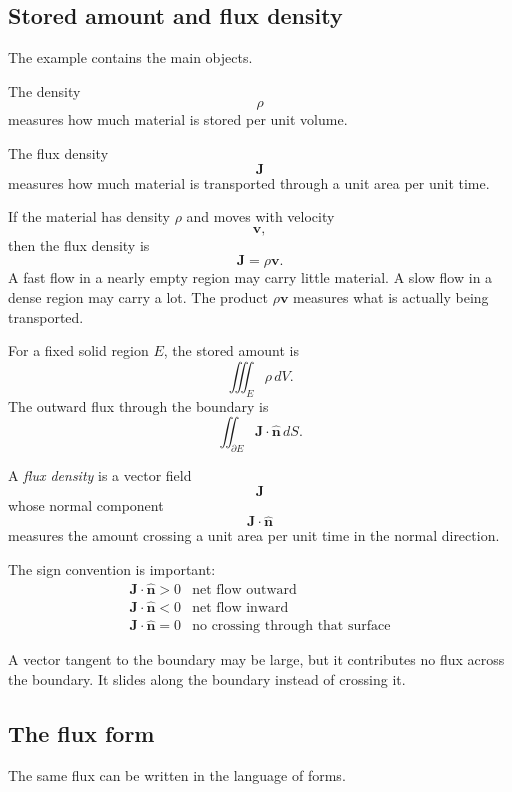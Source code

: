 \subsection{Stored amount and flux density}

The example contains the main objects.

The density
\[
    \rho
\]
measures how much material is stored per unit volume.

The flux density
\[
    \mathbf J
\]
measures how much material is transported through a unit area per unit time.

If the material has density \(\rho\) and moves with velocity
\[
    \mathbf v,
\]
then the flux density is
\[
\boxed{
    \mathbf J=\rho\mathbf v.
}
\]
A fast flow in a nearly empty region may carry little material.  A slow flow in a dense
region may carry a lot.  The product \(\rho\mathbf v\) measures what is actually being
transported.

For a fixed solid region \(E\), the stored amount is
\[
\boxed{
    \iiint_E \rho\,dV.
}
\]
The outward flux through the boundary is
\[
\boxed{
    \iint_{\partial E}\mathbf J\cdot\widehat{\mathbf n}\,dS.
}
\]

\begin{definition}
A \emph{flux density} is a vector field
\[
    \mathbf J
\]
whose normal component
\[
    \mathbf J\cdot\widehat{\mathbf n}
\]
measures the amount crossing a unit area per unit time in the normal direction.
\end{definition}

The sign convention is important:
\[
\begin{array}{c|c}
\mathbf J\cdot\widehat{\mathbf n}>0 & \text{net flow outward}\\[1mm]
\mathbf J\cdot\widehat{\mathbf n}<0 & \text{net flow inward}\\[1mm]
\mathbf J\cdot\widehat{\mathbf n}=0 & \text{no crossing through that surface}
\end{array}
\]

A vector tangent to the boundary may be large, but it contributes no flux across the
boundary.  It slides along the boundary instead of crossing it.

\subsection{The flux form}

The same flux can be written in the language of forms.

